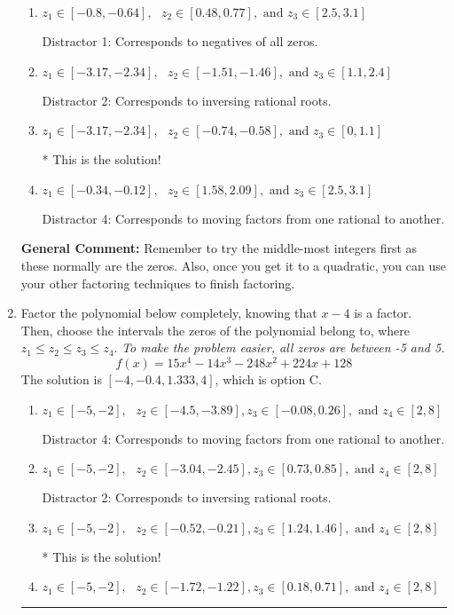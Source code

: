 \documentclass{extbook}[14pt]
\newcommand{\litem}[1]{\item #1

\rule{\textwidth}{0.4pt}}
\begin{document}
\begin{enumerate}
{\begin{enumerate}[label=\Alph*.]
 Distractor 3: Corresponds to negatives of all zeros AND inversing rational roots.
\item \( z_1 \in [-0.8, -0.64], \text{   }  z_2 \in [0.48, 0.77], \text{   and   } z_3 \in [2.5, 3.1] \)

 Distractor 1: Corresponds to negatives of all zeros.
\item \( z_1 \in [-3.17, -2.34], \text{   }  z_2 \in [-1.51, -1.46], \text{   and   } z_3 \in [1.1, 2.4] \)

 Distractor 2: Corresponds to inversing rational roots.
\item \( z_1 \in [-3.17, -2.34], \text{   }  z_2 \in [-0.74, -0.58], \text{   and   } z_3 \in [0, 1.1] \)

* This is the solution!
\item \( z_1 \in [-0.34, -0.12], \text{   }  z_2 \in [1.58, 2.09], \text{   and   } z_3 \in [2.5, 3.1] \)

 Distractor 4: Corresponds to moving factors from one rational to another.
\end{enumerate}

\textbf{General Comment:} Remember to try the middle-most integers first as these normally are the zeros. Also, once you get it to a quadratic, you can use your other factoring techniques to finish factoring.
}
\litem{
Factor the polynomial below completely, knowing that $x -4$ is a factor. Then, choose the intervals the zeros of the polynomial belong to, where $z_1 \leq z_2 \leq z_3 \leq z_4$. \textit{To make the problem easier, all zeros are between -5 and 5.}
\[ f(x) = 15x^{4} -14 x^{3} -248 x^{2} +224 x + 128 \]The solution is \( [-4, -0.4, 1.333, 4] \), which is option C.\begin{enumerate}[label=\Alph*.]
\item \( z_1 \in [-5, -2], \text{   }  z_2 \in [-4.5, -3.89], z_3 \in [-0.08, 0.26], \text{   and   } z_4 \in [2, 8] \)

 Distractor 4: Corresponds to moving factors from one rational to another.
\item \( z_1 \in [-5, -2], \text{   }  z_2 \in [-3.04, -2.45], z_3 \in [0.73, 0.85], \text{   and   } z_4 \in [2, 8] \)

 Distractor 2: Corresponds to inversing rational roots.
\item \( z_1 \in [-5, -2], \text{   }  z_2 \in [-0.52, -0.21], z_3 \in [1.24, 1.46], \text{   and   } z_4 \in [2, 8] \)

* This is the solution!
\item \( z_1 \in [-5, -2], \text{   }  z_2 \in [-1.72, -1.22], z_3 \in [0.18, 0.71], \text{   and   } z_4 \in [2, 8] \)


\end{enumerate}}
\end{enumerate}
\end{document}
